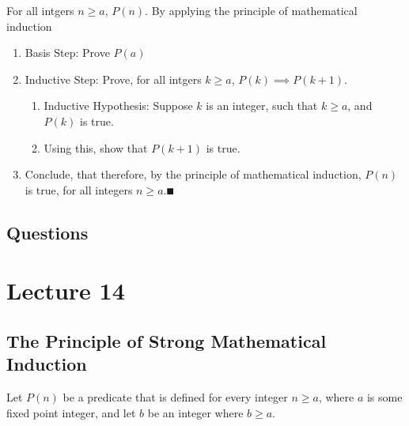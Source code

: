 \documentclass{report}
\begin{document}
\Lemma For all intgers $n\geq a$, $P(n)$.
\proof By applying the principle of mathematical induction \\
\begin{enumerate}
	\item Basis Step: Prove $P(a)$ 
	\item Inductive Step: Prove, for all intgers $k\geq a$, $P(k)\implies P(k+1)$.
	\begin{enumerate}
		\item Inductive Hypothesis: Suppose $k$ is an integer, such that $k\geq a$, and $P(k)$ is true.
		\item Using this, show that $P(k+1)$ is true.
	\end{enumerate}
	\item Conclude, that therefore, by the principle of mathematical induction, $P(n)$ is true, for all integers $n\geq a. \QED$
\end{enumerate}


\subsection*{Questions}
\qs{}{}

\newpage
\section{Lecture 14}
\subsection*{The Principle of Strong Mathematical Induction}
Let $P(n)$ be a predicate that is defined for every integer $n\geq a$, where $a$ is some fixed point integer, and let $b$ be an integer where $b\geq a$. \\ 
\end{document}
